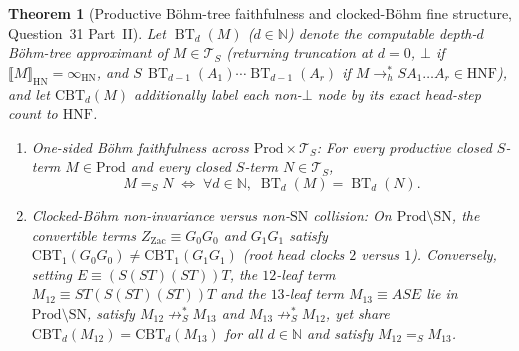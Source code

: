 \documentclass[11pt,reqno]{amsart}
\numberwithin{equation}{section}
\theoremstyle{plain}
\newtheorem{theorem}{Theorem}[section]
\theoremstyle{definition}
\theoremstyle{remark}
\DeclareMathOperator{\BT}{BT}
\newcommand{\TS}{\mathcal{T}_S}
\newcommand{\HNF}{\mathrm{HNF}}
\newcommand{\SN}{\mathrm{SN}}
\newcommand{\HN}{\mathrm{HN}}
\newcommand{\Prod}{\mathrm{Prod}}
\newcommand{\sem}[1]{\llbracket #1 \rrbracket}
\newcommand{\convS}{=_S}
\begin{document}
\begin{theorem}[Productive B\"ohm-tree faithfulness and clocked-B\"ohm fine structure, Question~31 Part~II]\label{thm:productive-bohm-faithful}
Let $\BT_d(M)$ ($d \in \mathbb{N}$) denote the computable depth-$d$ B\"ohm-tree approximant of $M \in \TS$ (returning truncation at $d = 0$, $\bot$ if $\sem{M}_{\HN} = \infty_{\HN}$, and $S\,\BT_{d-1}(A_1)\cdots\BT_{d-1}(A_r)$ if $M \to_h^* S A_1 \dots A_r \in \HNF$), and let $\mathrm{CBT}_d(M)$ additionally label each non-$\bot$ node by its exact head-step count to $\HNF$.
\begin{enumerate}[label=(\roman*),leftmargin=2.2em]
  \item \emph{One-sided B\"ohm faithfulness across $\Prod \times \TS$:} For every productive closed $S$-term $M \in \Prod$ and \emph{every} closed $S$-term $N \in \TS$,
  \[
  M \convS N \;\Longleftrightarrow\; \forall d \in \mathbb{N},\; \BT_d(M) = \BT_d(N).
  \]
  \item \emph{Clocked-B\"ohm non-invariance versus non-$\SN$ collision:} On $\Prod \setminus \SN$, the convertible terms $Z_{\mathrm{Zac}} \equiv G_0 G_0$ and $G_1 G_1$ satisfy $\mathrm{CBT}_1(G_0 G_0) \neq \mathrm{CBT}_1(G_1 G_1)$ (root head clocks $2$ versus $1$). Conversely, setting $E \equiv (S(S T)(S T))T$, the $12$-leaf term $M_{12} \equiv S T (S(S T)(S T)) T$ and the $13$-leaf term $M_{13} \equiv A S E$ lie in $\Prod \setminus \SN$, satisfy $M_{12} \not\to_S^* M_{13}$ and $M_{13} \not\to_S^* M_{12}$, yet share $\mathrm{CBT}_d(M_{12}) = \mathrm{CBT}_d(M_{13})$ for all $d \in \mathbb{N}$ and satisfy $M_{12} \convS M_{13}$.
\end{enumerate}
\end{theorem}
\end{document}
